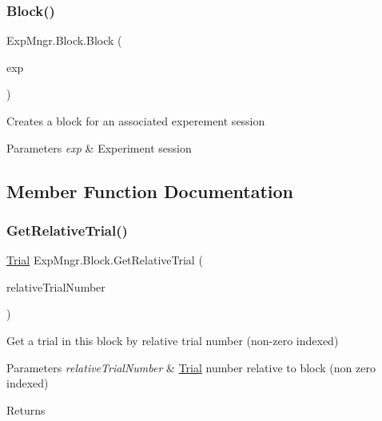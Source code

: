 \subsubsection{\texorpdfstring{Block()}{Block()}}
{\footnotesize\ttfamily Exp\+Mngr.\+Block.\+Block (\begin{DoxyParamCaption}\item[{\hyperlink{class_exp_mngr_1_1_experiment_session}{Experiment\+Session}}]{exp }\end{DoxyParamCaption})}



Creates a block for an associated experement session 


\begin{DoxyParams}{Parameters}
{\em exp} & Experiment session\\
\hline
\end{DoxyParams}


\subsection{Member Function Documentation}
\mbox{\label{class_exp_mngr_1_1_block_a3a97c3a7c705d2472649f01249f3db5a}} 
\subsubsection{\texorpdfstring{Get\+Relative\+Trial()}{GetRelativeTrial()}}
{\footnotesize\ttfamily \hyperlink{class_exp_mngr_1_1_trial}{Trial} Exp\+Mngr.\+Block.\+Get\+Relative\+Trial (\begin{DoxyParamCaption}\item[{int}]{relative\+Trial\+Number }\end{DoxyParamCaption})}



Get a trial in this block by relative trial number (non-\/zero indexed) 


\begin{DoxyParams}{Parameters}
{\em relative\+Trial\+Number} & \hyperlink{class_exp_mngr_1_1_trial}{Trial} number relative to block (non zero indexed)\\
\hline
\end{DoxyParams}
\begin{DoxyReturn}{Returns}

\end{DoxyReturn}


